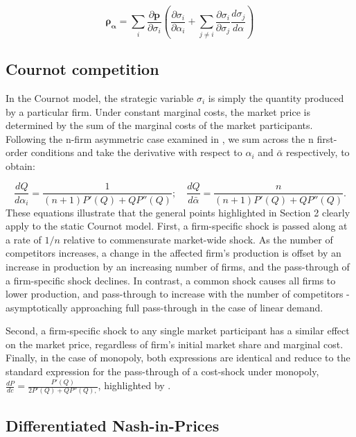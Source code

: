 \documentclass[12pt]{article}
\begin{document}
\[
\boldsymbol{\rho_{\alpha}}=\sum_{i}\frac{\partial\boldsymbol{p}}{\partial\sigma_{i}}(\frac{\partial\sigma_{i}}{\partial\alpha_{i}}+\sum_{j\neq i}\frac{\partial\sigma_{i}}{\partial\sigma_{j}}\frac{d\sigma_{j}}{d\alpha})
\]

\subsection{Cournot competition}

In the Cournot model, the strategic variable $\sigma_{i}$ is simply the quantity produced by a particular firm. Under constant marginal costs, the market price is determined by the sum of the marginal costs of the market participants. Following the n-firm asymmetric case examined in \citet{fevrier_idiosyncratic_2004} , we sum across the n first-order conditions and take the derivative with respect to $\alpha_{i}$ and $\bar{\alpha}$ respectively, to obtain:

\begin{equation}
\frac{dQ}{d\alpha_{i}}=\frac{1}{(n+1)P'(Q)+QP''(Q)};\quad\frac{dQ}{d\bar{\alpha}}=\frac{n}{(n+1)P'(Q)+QP''(Q)}.\label{eq:cournot passthrough}
\end{equation}
These equations illustrate that the general points highlighted in Section 2 clearly apply to the static Cournot model. First, a firm-specific shock is passed along at a rate of $1/n$ relative to commensurate market-wide shock. As the number of competitors increases, a change in the affected firm's production is offset by an increase in production by an increasing number of firms, and the pass-through of a firm-specific shock declines. In contrast, a common shock causes all firms to lower production, and pass-through to increase with the number of competitors - asymptotically approaching full pass-through in the case of linear demand.

Second, a firm-specific shock to any single market participant has a similar effect on the market price, regardless of firm's initial market share and marginal cost. Finally, in the case of monopoly, both expressions are identical and reduce to the standard expression for the pass-through of a cost-shock under monopoly, $\frac{dP}{dc}=\frac{P'(Q)}{2P'(Q)+QP''(Q),}$, highlighted by \citet{bulow_note_1983}.

\subsection{Differentiated Nash-in-Prices}
\end{document}
